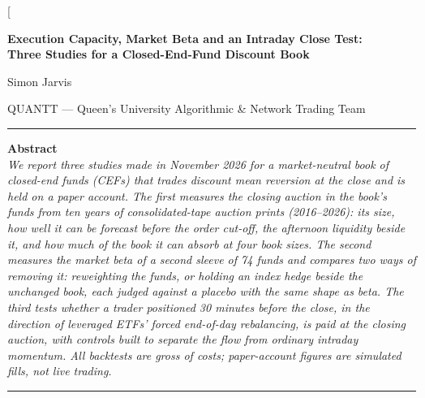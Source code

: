 \documentclass[10pt, a4paper, twocolumn]{article}
\begin{document}
\raggedbottom

\twocolumn[{%
\begin{center}
{\LARGE\bfseries Execution Capacity, Market Beta and an Intraday Close Test:\\
Three Studies for a Closed-End-Fund Discount Book\par}
\vspace{0.8em}
{\large Simon Jarvis\par}
\vspace{0.4em}
{\normalsize
QUANTT --- Queen's University Algorithmic \& Network Trading Team\\
\vspace{0.3em}
}
\vspace{0.5em}

\begin{minipage}{0.92\textwidth}
\rule{\linewidth}{0.4pt}
\vspace{0.3em}
\textbf{Abstract}\\[0.3em]
\small\itshape
We report three studies made in November 2026 for a market-neutral book of closed-end funds (CEFs) that trades discount mean reversion at the close and is held on a paper account. The first measures the closing auction in the book's funds from ten years of consolidated-tape auction prints (2016--2026): its size, how well it can be forecast before the order cut-off, the afternoon liquidity beside it, and how much of the book it can absorb at four book sizes. The second measures the market beta of a second sleeve of 74 funds and compares two ways of removing it: reweighting the funds, or holding an index hedge beside the unchanged book, each judged against a placebo with the same shape as beta. The third tests whether a trader positioned 30 minutes before the close, in the direction of leveraged ETFs' forced end-of-day rebalancing, is paid at the closing auction, with controls built to separate the flow from ordinary intraday momentum. All backtests are gross of costs; paper-account figures are simulated fills, not live trading.
\vspace{0.3em}
\rule{\linewidth}{0.4pt}
\vspace{0.4em}


\end{minipage}
\end{center}}
\end{document}
